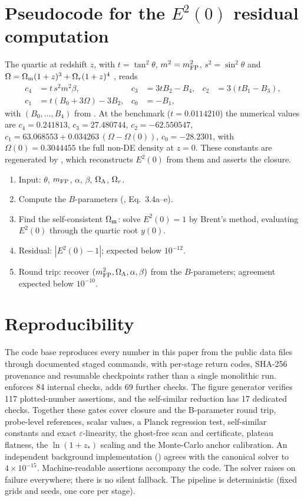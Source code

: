\section{Pseudocode for the \texorpdfstring{$E^2(0)$}{E2(0)} residual computation}\label{app:pseudo}
The quartic at redshift $z$, with $t=\tan^2\theta$, $m^2=m_{\mathrm{FP}}^2$, $s^2=\sin^2\theta$ and $\Omega=\Omega_{\mathrm m}(1+z)^3+\Omega_{r}(1+z)^4$ \citep[][Eq.~5.5]{Hogas2021}, reads
\begin{equation}
\begin{aligned}
c_4&=t\,s^2m^2\beta, & c_3&=3tB_2-B_4, & c_2&=3(tB_1-B_3),\\
c_1&=t(B_0+3\Omega)-3B_2, & c_0&=-B_1,
\end{aligned}
\end{equation}
with $(B_0,\dots,B_4)$ from \citet[][Eq.~3.4a--e]{Hogas2021}. At the benchmark ($t=0.0114210$) the numerical values are $c_4=0.241813$, $c_3=27.480744$, $c_2=-62.550547$, $c_1=63.068553+0.034263\,(\Omega-\Omega(0))$, $c_0=-28.2301$, with $\Omega(0)=0.3044455$ the full non-DE density at $z=0$. These constants are regenerated by , which reconstructs $E^2(0)$ from them and asserts the closure.
\begin{enumerate}
\item Input: $\theta$, $m_{\mathrm{FP}}$, $\alpha$, $\beta$, $\Omega_{\Lambda}$, $\Omega_{r}$.
\item Compute the $B$-parameters (\citealp{Hogas2021}, Eq.~3.4a--e).
\item Find the self-consistent $\Omega_{\mathrm m}$: solve $E^2(0)=1$ by Brent's method, evaluating $E^2(0)$ through the quartic root $y(0)$.
\item Residual: $|E^2(0)-1|$; expected below $10^{-12}$.
\item Round trip: recover $(m_{\mathrm{FP}}^2,\Omega_{\Lambda},\alpha,\beta)$ from the $B$-parameters; agreement expected below $10^{-10}$.
\end{enumerate}

\section{Reproducibility}\label{app:repro}
The code base  reproduces every number in this paper from the public data files through documented staged commands, with per-stage return codes, SHA-256 provenance and resumable checkpoints rather than a single monolithic run.  enforces 84 internal checks,  adds 69 further checks. The figure generator verifies 117 plotted-number assertions, and the self-similar reduction has 17 dedicated checks. Together these gates cover closure and the B-parameter round trip, probe-level references, scalar values, a Planck regression test, self-similar constants and exact $\varepsilon$-linearity, the ghost-free scan and certificate, plateau flatness, the $\ln(1+z_*)$ scaling and the Monte-Carlo anchor calibration. An independent background implementation () agrees with the canonical solver to $4\times10^{-15}$. Machine-readable assertions accompany the code. The solver raises on failure everywhere; there is no silent fallback. The pipeline is deterministic (fixed grids and seeds, one core per stage).

